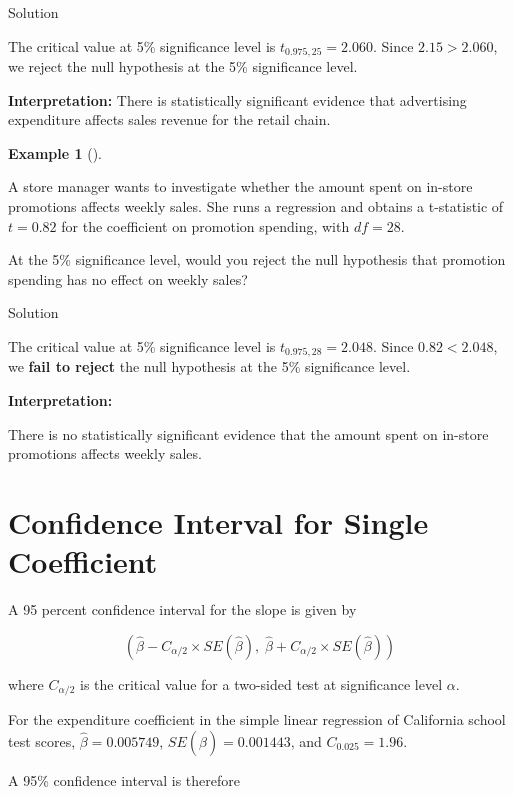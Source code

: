 \documentclass[
  12pt,
  letterpaper,
]{scrbook}
\theoremstyle{definition}
\newtheorem{example}{Example}[chapter]
\theoremstyle{plain}
\theoremstyle{remark}
\begin{document}
Solution

\label{solution2}
The critical value at 5\% significance level is \(t_{0.975,25}=2.060\).
Since \(2.15 > 2.060\), we reject the null hypothesis at the 5\%
significance level.

\textbf{Interpretation:} There is statistically significant evidence
that advertising expenditure affects sales revenue for the retail chain.

\begin{example}[]\protect\hypertarget{exm-3}{}\label{exm-3}

A store manager wants to investigate whether the amount spent on
in-store promotions affects weekly sales. She runs a regression and
obtains a t-statistic of \(t = 0.82\) for the coefficient on promotion
spending, with \(df = 28\).

At the 5\% significance level, would you reject the null hypothesis that
promotion spending has no effect on weekly sales?

\end{example}

Solution

\label{solution3}
The critical value at 5\% significance level is \(t_{0.975,28}=2.048\).
Since \(0.82 < 2.048\), we \textbf{fail to reject} the null hypothesis
at the 5\% significance level.

\textbf{Interpretation:}

There is no statistically significant evidence that the amount spent on
in-store promotions affects weekly sales.

\section{Confidence Interval for Single
Coefficient}\label{confidence-interval-for-single-coefficient}

A 95 percent confidence interval for the slope is given by

\[
\left(\hat{\beta}-C_{\alpha/2}\times SE(\hat{\beta}),\; \hat{\beta}+C_{\alpha/2}\times SE(\hat{\beta})\right)
\]

where \(C_{\alpha/2}\) is the critical value for a two-sided test at
significance level \(\alpha\).

For the expenditure coefficient in the simple linear regression of
California school test scores, \(\hat{\beta}=0.005749\),
\(SE(\hat{\beta})=0.001443\), and \(C_{0.025}=1.96\).

A 95\% confidence interval is therefore
\end{document}
